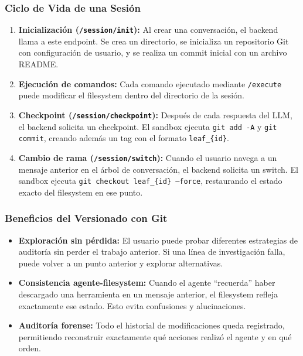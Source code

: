 \subsubsection{Ciclo de Vida de una Sesión}

\begin{enumerate}
    \item \textbf{Inicialización (\texttt{/session/init}):} Al crear una conversación, el backend llama a este endpoint. Se crea un directorio, se inicializa un repositorio Git con configuración de usuario, y se realiza un commit inicial con un archivo README.
    
    \item \textbf{Ejecución de comandos:} Cada comando ejecutado mediante \texttt{/execute} puede modificar el filesystem dentro del directorio de la sesión.
    
    \item \textbf{Checkpoint (\texttt{/session/checkpoint}):} Después de cada respuesta del LLM, el backend solicita un checkpoint. El sandbox ejecuta \texttt{git add -A} y \texttt{git commit}, creando además un tag con el formato \texttt{leaf\_\{id\}}.
    
    \item \textbf{Cambio de rama (\texttt{/session/switch}):} Cuando el usuario navega a un mensaje anterior en el árbol de conversación, el backend solicita un switch. El sandbox ejecuta \texttt{git checkout leaf\_\{id\} --force}, restaurando el estado exacto del filesystem en ese punto.
\end{enumerate}

\subsubsection{Beneficios del Versionado con Git}

\begin{itemize}
    \item \textbf{Exploración sin pérdida:} El usuario puede probar diferentes estrategias de auditoría sin perder el trabajo anterior. Si una línea de investigación falla, puede volver a un punto anterior y explorar alternativas.
    
    \item \textbf{Consistencia agente-filesystem:} Cuando el agente ``recuerda'' haber descargado una herramienta en un mensaje anterior, el filesystem refleja exactamente ese estado. Esto evita confusiones y alucinaciones.
    
    \item \textbf{Auditoría forense:} Todo el historial de modificaciones queda registrado, permitiendo reconstruir exactamente qué acciones realizó el agente y en qué orden.
\end{itemize}

